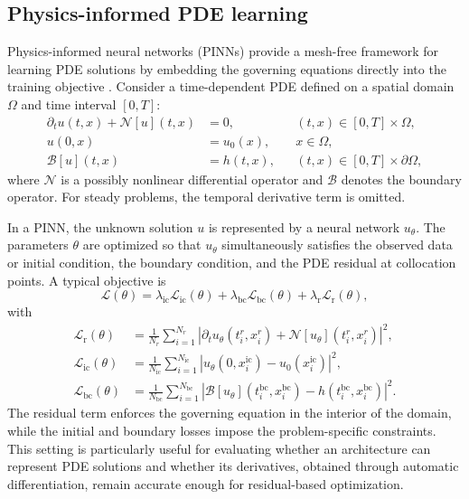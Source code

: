 \documentclass[preprint,12pt]{elsarticle}
\begin{document}
\subsection{Physics-informed PDE learning}
Physics-informed neural networks (PINNs) provide a mesh-free framework for learning PDE solutions by embedding the governing equations directly into the training objective \cite{raissi2019pinn}. Consider a time-dependent PDE defined on a spatial domain \(\Omega\) and time interval \([0,T]\):
\begin{equation}
\begin{aligned}
  \partial_t u(t,x) + \mathcal{N}[u](t,x) &= 0,
  && (t,x)\in [0,T]\times \Omega, \\
  u(0,x) &= u_0(x),
  && x\in \Omega, \\
  \mathcal{B}[u](t,x) &= h(t,x),
  && (t,x)\in [0,T]\times \partial\Omega,
\end{aligned}
\label{eq:pinn_general_pde}
\end{equation}
where \(\mathcal{N}\) is a possibly nonlinear differential operator and \(\mathcal{B}\) denotes the boundary operator. For steady problems, the temporal derivative term is omitted.

In a PINN, the unknown solution \(u\) is represented by a neural network \(u_\theta\). The parameters \(\theta\) are optimized so that \(u_\theta\) simultaneously satisfies the observed data or initial condition, the boundary condition, and the PDE residual at collocation points. A typical objective is
\begin{equation}
  \mathcal{L}(\theta)
  =
  \lambda_{\mathrm{ic}}\mathcal{L}_{\mathrm{ic}}(\theta)
  +
  \lambda_{\mathrm{bc}}\mathcal{L}_{\mathrm{bc}}(\theta)
  +
  \lambda_{\mathrm{r}}\mathcal{L}_{\mathrm{r}}(\theta),
\end{equation}
with
\begin{equation}
\begin{aligned}
  \mathcal{L}_{\mathrm{r}}(\theta)
  &=
  \frac{1}{N_r}
  \sum_{i=1}^{N_r}
  \left|
  \partial_t u_\theta(t_i^r,x_i^r)
  +
  \mathcal{N}[u_\theta](t_i^r,x_i^r)
  \right|^2, \\
  \mathcal{L}_{\mathrm{ic}}(\theta)
  &=
  \frac{1}{N_{\mathrm{ic}}}
  \sum_{i=1}^{N_{\mathrm{ic}}}
  \left|
  u_\theta(0,x_i^{\mathrm{ic}})-u_0(x_i^{\mathrm{ic}})
  \right|^2, \\
  \mathcal{L}_{\mathrm{bc}}(\theta)
  &=
  \frac{1}{N_{\mathrm{bc}}}
  \sum_{i=1}^{N_{\mathrm{bc}}}
  \left|
  \mathcal{B}[u_\theta](t_i^{\mathrm{bc}},x_i^{\mathrm{bc}})
  -
  h(t_i^{\mathrm{bc}},x_i^{\mathrm{bc}})
  \right|^2.
\end{aligned}
\end{equation}
The residual term enforces the governing equation in the interior of the domain, while the initial and boundary losses impose the problem-specific constraints. This setting is particularly useful for evaluating whether an architecture can represent PDE solutions and whether its derivatives, obtained through automatic differentiation, remain accurate enough for residual-based optimization.
\end{document}

